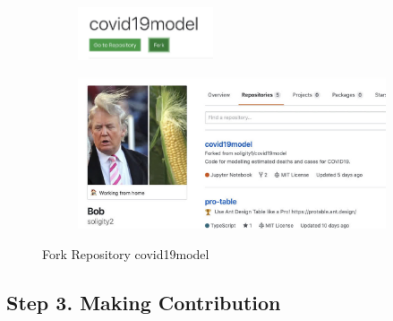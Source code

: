 \documentclass[12pt]{article}
\renewcommand{\_}{\kern-1.5pt\textunderscore\kern-1.5pt}
\begin{document}
\begin{figure}[H]
	\centering

	\begin{subfigure}[c]{\textwidth}
		\centering
		\includegraphics[width=4cm]{graphs/31. bob_fork_project}
	\end{subfigure}
	\begin{subfigure}[b]{.80\textwidth}
		\centering
		\includegraphics[width=10cm]{graphs/32. bob_forked_github}
	\end{subfigure}

	\caption{Fork Repository covid19model}
\end{figure}


\subsection{Step 3. Making Contribution}

\end{document}

